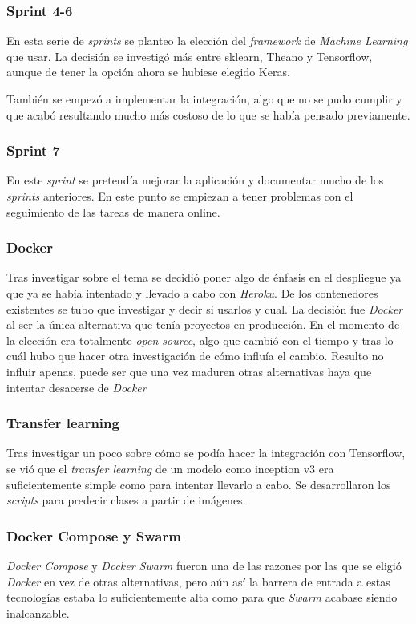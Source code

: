 \subsubsection{Sprint 4-6}
En esta serie de \emph{sprints} se planteo la elección del \emph{framework} de \emph{Machine Learning}  que usar. La decisión se investigó más entre sklearn, Theano y Tensorflow, aunque de tener la opción ahora se hubiese elegido Keras.

También se empezó a implementar la integración, algo que no se pudo cumplir y que acabó resultando mucho más costoso de lo que se había pensado previamente.

\subsubsection{Sprint 7}
En este \emph{sprint} se pretendía mejorar la aplicación y documentar mucho de los \emph{sprints} anteriores.
En este punto se empiezan a tener problemas con el seguimiento de las tareas de manera online.

\subsubsection{Docker}
Tras investigar sobre el tema se decidió poner algo de énfasis en el despliegue ya que ya se había intentado y llevado a cabo con \emph{Heroku}. De los contenedores existentes se tubo que investigar y decir si usarlos y cual. La decisión fue \emph{Docker} al ser la única alternativa que tenía proyectos en producción. En el momento de la elección era totalmente \emph{open source}, algo que cambió con el tiempo y tras lo cuál hubo que hacer otra investigación de cómo influía el cambio. Resulto no influir apenas, puede ser que una vez maduren otras alternativas haya que intentar desacerse de \emph{Docker}

\subsubsection{Transfer learning}
Tras investigar un poco sobre cómo se podía hacer la integración con Tensorflow, se vió que el \emph{transfer learning} de un modelo como inception v3 era suficientemente simple como para intentar llevarlo a cabo.
Se desarrollaron los \emph{scripts} para predecir clases a partir de imágenes.

\subsubsection{Docker Compose y Swarm}
\emph{Docker Compose} y \emph{Docker Swarm} fueron una de las razones por las que se eligió \emph{Docker} en vez de otras alternativas, pero aún así la barrera de entrada a estas tecnologías estaba lo suficientemente alta como para que \emph{Swarm} acabase siendo inalcanzable.

